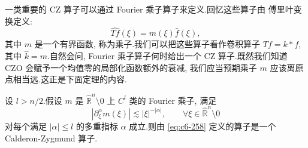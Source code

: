 
一类重要的 CZ 算子可以通过 Fourier 乘子算子来定义.回忆这些算子由 傅里叶变换定义:
\begin{equation}
\widehat{Tf}(\xi) = m(\xi) \hat{f}(\xi), \label{eq:c6-258}
\end{equation}
其中 $m$ 是一个有界函数, 称为乘子.我们可以把这些算子看作卷积算子 $Tf = k * f$, 其中 $\hat{k} = m$.自然会问, Fourier 乘子算子何时给出一个 CZ 算子.既然我们知道 CZO 会赋予一个均值零的局部化函数额外的衰减, 我们应当预期乘子 $m$ 应该离原点相当远.这正是下面定理的内容.

\begin{theorem}\label{thm:c6-6.11}
设 $l > n/2$.假设 $m$ 是 $\widehat{\mathbb{R}}^n \setminus 0$ 上 $C^l$ 类的 Fourier 乘子, 满足
\[
|\partial_\xi^\alpha m(\xi)| \lesssim |\xi|^{-|\alpha|}, \qquad \forall \xi \in \widehat{\mathbb{R}}^n \setminus 0
\]
对每个满足 $|\alpha| \leq l$ 的多重指标 $\alpha$ 成立.则由 \eqref{eq:c6-258} 定义的算子是一个 Calderon-Zygmund 算子.
\end{theorem}


